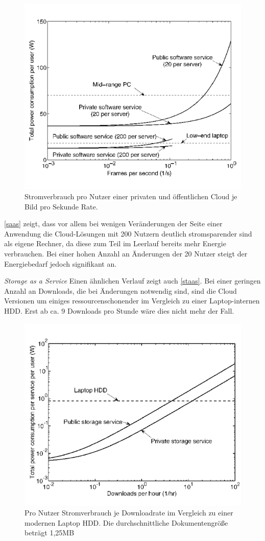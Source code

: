 \documentclass[utf8,biblatex]{lni}
\begin{document}
\begin{figure}[ht]
\centering
\includegraphics[width=.6\linewidth]{saas.png}
\caption{{\centering 
Stromverbrauch pro Nutzer einer privaten und öffentlichen Cloud je Bild pro Sekunde Rate. \cite{ Baliga11}
}}
\label{saas}
\end{figure}

\autoref{saas} zeigt, dass vor allem bei wenigen Veränderungen der Seite einer Anwendung die Cloud-Lösungen mit 200 Nutzern deutlich stromsparender sind als eigene Rechner, da diese zum Teil im Leerlauf bereits mehr Energie verbrauchen. Bei einer hohen Anzahl an Änderungen der 20 Nutzer steigt der Energiebedarf jedoch signifikant an.

\textit{Storage as a Service} \newline
Einen ähnlichen Verlauf zeigt auch \autoref{staas}. Bei einer geringen Anzahl an Downloads, die bei Änderungen notwendig sind, sind die Cloud Versionen um einiges ressourcenschonender im Vergleich zu einer Laptop-internen HDD. Erst ab ca. 9 Downloads pro Stunde wäre dies nicht mehr der Fall.
\begin{figure}[ht]
\centering
\includegraphics[width=.6\linewidth]{staas.png}
\caption{{\centering 
Pro Nutzer Stromverbrauch je Downloadrate im Vergleich zu einer modernen Laptop HDD. Die durchschnittliche Dokumentengröße beträgt 1,25MB \cite{ Baliga11}
}}
\label{staas}
\end{figure}
\end{document}

